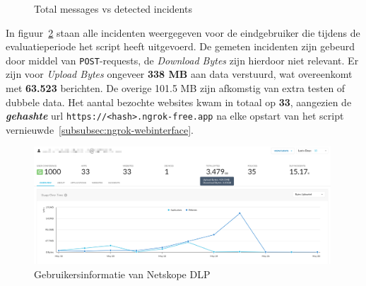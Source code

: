 \begin{figure}[H]
  \centering
  \caption{Total messages vs detected incidents}
  \label{fig:pie-message-vs-incident}
\end{figure}

In figuur~\ref{fig:netskope_user_info} staan alle incidenten weergegeven voor de eindgebruiker die tijdens de evaluatieperiode het script heeft uitgevoerd.
De gemeten incidenten zijn gebeurd door middel van \texttt{POST}-requests, de \textit{Download Bytes} zijn hierdoor niet relevant.
Er zijn voor \textit{Upload Bytes} ongeveer \textbf{338 MB} aan data verstuurd, wat overeenkomt met \textbf{63.523} berichten. 
De overige 101.5 MB zijn afkomstig van extra testen of dubbele data. 
Het aantal bezochte websites kwam in totaal op \textbf{33}, aangezien de \textit{\textbf{gehashte}} \gls{url} \texttt{https://<hash>.ngrok-free.app} 
na elke opstart van het script vernieuwde~\ref{subsubsec:ngrok-webinterface}.

\begin{figure}[H]
    \centering
    \scriptsize
    \includegraphics[width=0.99\textwidth]{img/user_info.png}
    \caption{Gebruikersinformatie van Netskope DLP}
    \label{fig:netskope_user_info}
\end{figure}

\subsection{}
\label{subsec:incidenten-risicoscore}

